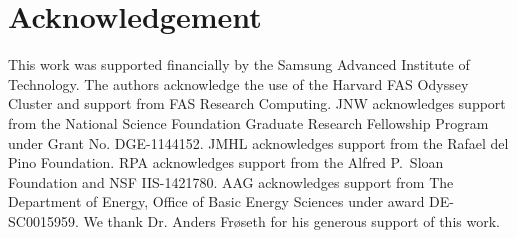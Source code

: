 \section{Acknowledgement}

This work was supported financially by the Samsung Advanced Institute of Technology.
The authors acknowledge the use of the Harvard FAS Odyssey Cluster and support from FAS Research Computing.
JNW acknowledges support from the National Science Foundation Graduate Research Fellowship Program under Grant No. DGE-1144152.
JMHL acknowledges support from the Rafael del Pino Foundation. RPA acknowledges support from the Alfred P.\ Sloan Foundation and NSF IIS-1421780. AAG acknowledges support from The Department of Energy, Office of Basic Energy Sciences under award DE-SC0015959.
We thank Dr. Anders Fr\o seth for his generous support of this work.
